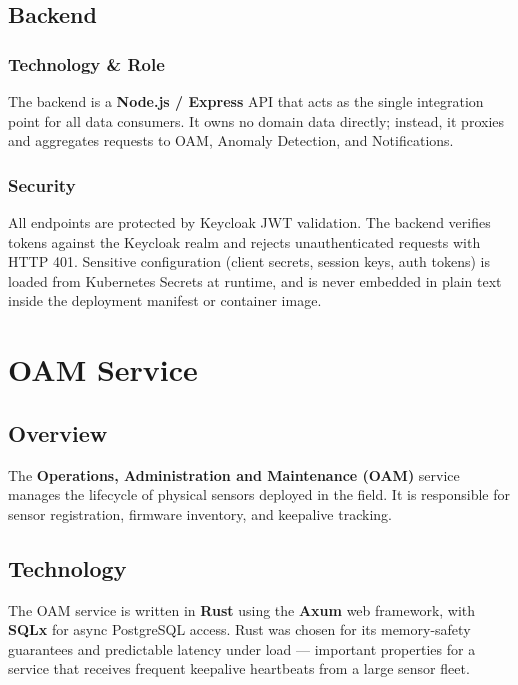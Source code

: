 \documentclass[12pt,a4paper,oneside]{report}
\begin{document}
\section{Backend}

\subsection{Technology \& Role}

The backend is a \textbf{Node.js / Express} API that acts as the single integration point for all data consumers. It owns no domain data directly; instead, it proxies and aggregates requests to OAM, Anomaly Detection, and Notifications.

\subsection{Security}

All endpoints are protected by Keycloak JWT validation. The backend verifies tokens against the Keycloak realm and rejects unauthenticated requests with HTTP 401. Sensitive configuration (client secrets, session keys, auth tokens) is loaded from Kubernetes Secrets at runtime, and is never embedded in plain text inside the deployment manifest or container image.

\chapter{OAM Service}
\label{ch:oam}

\section{Overview}

The \textbf{Operations, Administration and Maintenance (OAM)} service manages the lifecycle of physical sensors deployed in the field. It is responsible for sensor registration, firmware inventory, and keepalive tracking.

\section{Technology}

The OAM service is written in \textbf{Rust} using the \textbf{Axum} web framework, with \textbf{SQLx} for async PostgreSQL access. Rust was chosen for its memory-safety guarantees and predictable latency under load — important properties for a service that receives frequent keepalive heartbeats from a large sensor fleet.
\end{document}

